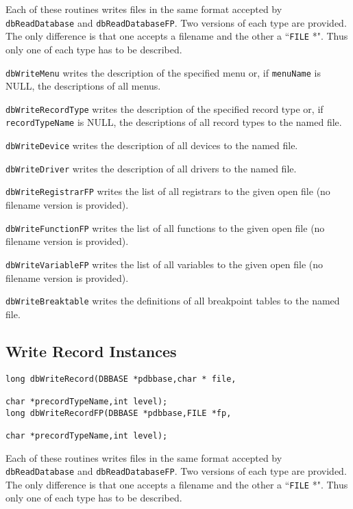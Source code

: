 Each of these routines writes files in the same format accepted by \verb|dbReadDatabase| and \verb|dbReadDatabaseFP|. Two 
versions of each type are provided. The only difference is that one accepts a filename and the other a ``\verb|FILE| *". Thus only 
one of each type has to be described.

\verb|dbWriteMenu| writes the description of the specified menu or, if \verb|menuName| is NULL, the descriptions of all menus.

\verb|dbWriteRecordType| writes the description of the specified record type or, if \verb|recordTypeName| is NULL, the 
descriptions of all record types to the named file.

\verb|dbWriteDevice| writes the description of all devices to the named file.

\verb|dbWriteDriver| writes the description of all drivers to the named file.

\verb|dbWriteRegistrarFP| writes the list of all registrars to the given open file (no filename version is provided).

\verb|dbWriteFunctionFP| writes the list of all functions to the given open file (no filename version is provided).

\verb|dbWriteVariableFP| writes the list of all variables to the given open file (no filename version is provided).

\verb|dbWriteBreaktable| writes the definitions of all breakpoint tables to the named file.

\subsection{Write Record Instances}

\begin{verbatim}
long dbWriteRecord(DBBASE *pdbbase,char * file,

char *precordTypeName,int level);
long dbWriteRecordFP(DBBASE *pdbbase,FILE *fp,

char *precordTypeName,int level);
\end{verbatim}

Each of these routines writes files in the same format accepted by \verb|dbReadDatabase| and \verb|dbReadDatabaseFP|. Two 
versions of each type are provided. The only difference is that one accepts a filename and the other a ``\verb|FILE| *". Thus only 
one of each type has to be described.

